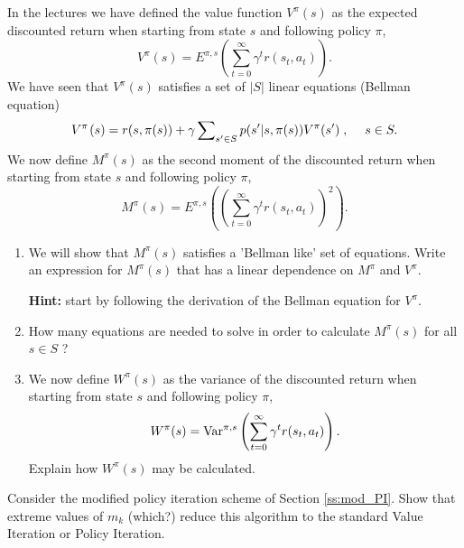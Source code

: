 \begin{exercise}
In the lectures we have defined the value function $V_{}^\pi (s)$ as the expected discounted return when starting from state $s$ and following policy $\pi $,
\[V_{}^\pi (s) = {E^{\pi ,s}}(\sum\limits_{t = 0}^\infty  {{\gamma ^t}r({s_t},{a_t})} ).\]
We have seen that $V_{}^\pi (s)$ satisfies a set of  $|S|$ linear equations (Bellman equation)
\[{V^\pi }{\kern 1pt} (s) = r(s,\pi (s)) + \gamma \sum\nolimits_{s' \in S} {p(s'|s,\pi (s)){V^\pi }(s')} \;,\quad \;s \in S.\]
We now define $M_{}^\pi (s)$ as the second moment of the discounted return when starting from state $s$ and following policy $\pi $,
\[M_{}^\pi (s) = {E^{\pi ,s}}\left( {{{\left( {\sum\limits_{t = 0}^\infty  {{\gamma ^t}r({s_t},{a_t})} } \right)}^2}} \right).\]
\begin{enumerate}
  \item We will show that $M_{}^\pi (s)$ satisfies a 'Bellman like' set of equations. Write an expression for $M_{}^\pi (s)$ that has a linear dependence on $M_{}^\pi $ and  $V_{}^\pi $.

\textbf{Hint:} start by following the derivation of the Bellman equation for $V_{}^\pi .$
  \item How many equations are needed to solve in order to calculate $M_{}^\pi (s)$ for all $s \in S$ ?
  \item We now define $W_{}^\pi (s)$ as the variance of the discounted return when starting from state $s$ and following policy $\pi $,
\[W_{}^\pi (s) = {\rm{Va}}{{\rm{r}}^{\pi ,s}}\left( {\sum\limits_{t = 0}^\infty  {{\gamma ^t}r({s_t},{a_t})} } \right).\]
Explain how $W_{}^\pi (s)$ may be calculated.
\end{enumerate}
\end{exercise}

\begin{exercise}
Consider the modified policy iteration scheme of Section \ref{ss:mod_PI}.
Show that extreme values of ${m_k}$ (which?) reduce this algorithm to the standard Value Iteration or Policy Iteration.
\end{exercise}
